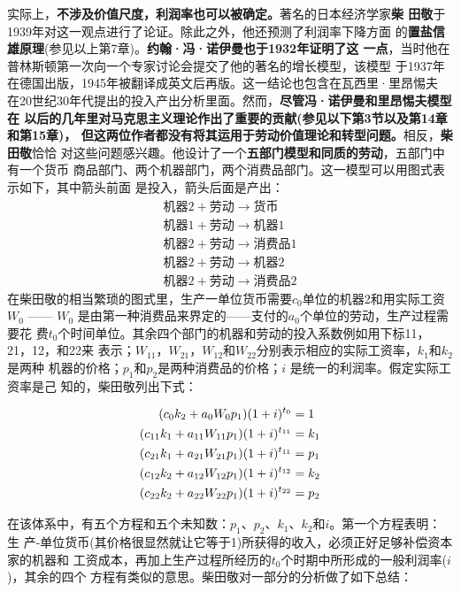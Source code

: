 实际上，\textbf{不涉及价值尺度，利润率也可以被确定。}著名的日本经济学家\textbf{柴
  田敬}于1939年对这一观点进行了论证。除此之外，他还预测了利润率下降方面
的\textbf{置盐信雄原理}(参见以上第7章)。\textbf{约翰·冯·诺伊曼也于1932年证明了这
  一点}，当时他在普林斯顿第一次向一个专家讨论会提交了他的著名的增长模型，该模型
于1937年在德国出版，1945年被翻译成英文后再版。这一结论也包含在瓦西里·里昂惕夫
在20世纪30年代提出的投入产出分析里面。然而，\textbf{尽管冯·诺伊曼和里昂惕夫模型在
  以后的几年里对马克思主义理论作出了重要的贡献(参见以下第3节以及第14章和第15章)，
  但这两位作者都没有将其运用于劳动价值理论和转型问题。}相反，\textbf{柴田敬}恰恰
对这些问题感兴趣。他设计了一个\textbf{五部门模型和同质的劳动}，五部门中有一个货币
商品部门、两个机器部门，两个消费品部门。这一模型可以用图式表示如下，其中箭头前面
是投入，箭头后面是产出：
\begin{gather*}
机器2 + 劳动 \rightarrow 货币 \\
机器1 + 劳动 \rightarrow 机器1 \\
机器2 + 劳动 \rightarrow 消费品1 \\
机器2 + 劳动 \rightarrow 机器2 \\
机器2 + 劳动 \rightarrow 消费品2
\end{gather*}
在柴田敬的相当繁琐的图式里，生产一单位货币需要$c_0$单位的机器2和用实际工资$W_0$
—— $W_0$ 是由第一种消费品来界定的——支付的$a_0$个单位的劳动，生产过程需要花
费$t_0$个时间单位。其余四个部门的机器和劳动的投入系数例如用下标11，21，12，和22来
表示；$W_{11}，W_{21}，W_{12}和W_{22}$分别表示相应的实际工资率，$k_1和k_2$是两种
机器的价格；$p_1和p_2$是两种消费品的价格；$i$ 是统一的利润率。假定实际工资率是己
知的，柴田敬列出下式：

\begin{align}
(c_0k_2+a_0W_0p_1)(1+i)^{t_0} &=1 \notag \\
(c_{11}k_1+a_{11}W_{11}p_1)(1+i)^{t_{11}} &=k_1 \notag \\
(c_{21}k_1+a_{21}W_{21}p_1)(1+i)^{t_{11}} &=p_1 \notag \\
(c_{12}k_2+a_{12}W_{12}p_1)(1+i)^{t_{12}} &=k_2 \notag \\
(c_{22}k_2+a_{22}W_{22}p_1)(1+i)^{t_{22}} &=p_2
\end{align}

在该体系中，有五个方程和五个未知数：$p_1、p_2、k_1、k_2和i$。第一个方程表明：生
产-单位货币(其价格很显然就让它等于1)所获得的收入，必须正好足够补偿资本家的机器和
工资成本，再加上生产过程所经历的$t_0$个时期中所形成的一般利润率($i$)，其余的四个
方程有类似的意思。柴田敬对一部分的分析做了如下总结：

